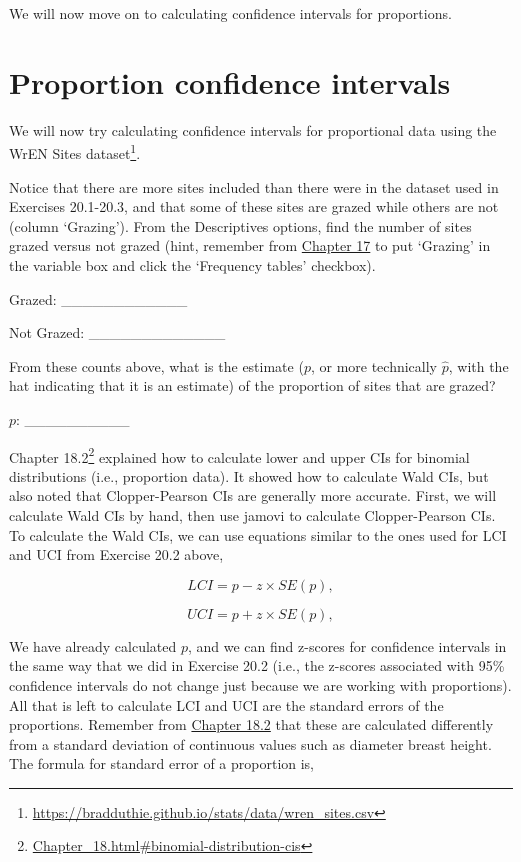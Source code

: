 \documentclass[
  openany]{krantz}
\renewcommand{\href}[2]{#2\footnote{\url{#1}}}
\begin{document}
We will now move on to calculating confidence intervals for proportions.

\hypertarget{proportion-confidence-intervals}{%
\section{Proportion confidence intervals}\label{proportion-confidence-intervals}}

We will now try calculating confidence intervals for proportional data using the WrEN Sites dataset\footnote{\url{https://bradduthie.github.io/stats/data/wren_sites.csv}}.

Notice that there are more sites included than there were in the dataset used in Exercises 20.1-20.3, and that some of these sites are grazed while others are not (column `Grazing').
From the Descriptives options, find the number of sites grazed versus not grazed (hint, remember from \protect\hyperlink{Chapter_17}{Chapter 17} to put `Grazing' in the variable box and click the `Frequency tables' checkbox).

Grazed: \_\_\_\_\_\_\_\_\_\_\_\_

Not Grazed: \_\_\_\_\_\_\_\_\_\_\_\_\_

From these counts above, what is the estimate (\(p\), or more technically \(\hat{p}\), with the hat indicating that it is an estimate) of the proportion of sites that are grazed?

\(p\): \_\_\_\_\_\_\_\_\_\_

\href{Chapter_18.html\#binomial-distribution-cis}{Chapter 18.2} explained how to calculate lower and upper CIs for binomial distributions (i.e., proportion data).
It showed how to calculate Wald CIs, but also noted that Clopper-Pearson CIs are generally more accurate.
First, we will calculate Wald CIs by hand, then use jamovi to calculate Clopper-Pearson CIs.
To calculate the Wald CIs, we can use equations similar to the ones used for LCI and UCI from Exercise 20.2 above,

\[LCI = p - z \times SE(p),\]

\[UCI = p + z \times SE(p),\]

We have already calculated \(p\), and we can find z-scores for confidence intervals in the same way that we did in Exercise 20.2 (i.e., the z-scores associated with 95\% confidence intervals do not change just because we are working with proportions).
All that is left to calculate LCI and UCI are the standard errors of the proportions.
Remember from \protect\hyperlink{binomial-distribution-cis}{Chapter 18.2} that these are calculated differently from a standard deviation of continuous values such as diameter breast height.
The formula for standard error of a proportion is,
\end{document}
